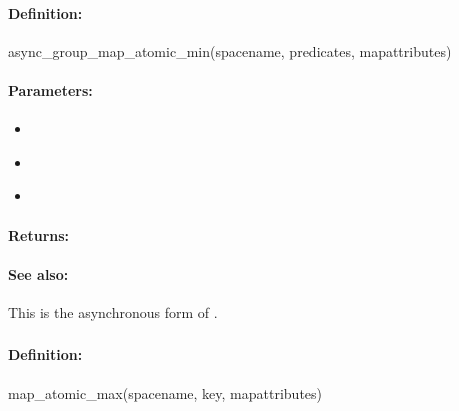\paragraph{Definition:}
\begin{rubycode}
async_group_map_atomic_min(spacename, predicates, mapattributes)
\end{rubycode}

\paragraph{Parameters:}
\begin{itemize}[noitemsep]
\item {}\\

\item {}\\

\item {}\\

\end{itemize}

\paragraph{Returns:}


\paragraph{See also:}  This is the asynchronous form of .

\pagebreak
\subsubsection{}
\label{api:ruby:map_atomic_max}


\paragraph{Definition:}
\begin{rubycode}
map_atomic_max(spacename, key, mapattributes)
\end{rubycode}

